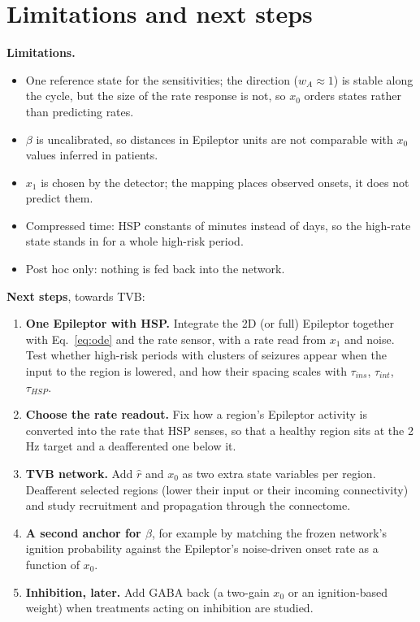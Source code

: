 \documentclass[11pt]{article}
\begin{document}
\section{Limitations and next steps}
\textbf{Limitations.}
\begin{itemize}
\item One reference state for the sensitivities; the direction ($w_A\approx1$) is stable along the cycle, but the size of
the rate response is not, so $x_0$ orders states rather than predicting rates.
\item $\beta$ is uncalibrated, so distances in Epileptor units are not comparable with $x_0$ values inferred in patients.
\item $x_1$ is chosen by the detector; the mapping places observed onsets, it does not predict them.
\item Compressed time: HSP constants of minutes instead of days, so the high-rate state stands in for a whole high-risk
period.
\item Post hoc only: nothing is fed back into the network.
\end{itemize}

\textbf{Next steps}, towards TVB:
\begin{enumerate}
\item \textbf{One Epileptor with HSP.} Integrate the 2D (or full) Epileptor together with Eq.~\eqref{eq:ode} and the rate
sensor, with a rate read from $x_1$ and noise. Test whether high-risk periods with clusters of seizures appear when the
input to the region is lowered, and how their spacing scales with $\tau_{ins}$, $\tau_{int}$, $\tau_{HSP}$.
\item \textbf{Choose the rate readout.} Fix how a region's Epileptor activity is converted into the rate that HSP senses,
so that a healthy region sits at the 2\,Hz target and a deafferented one below it.
\item \textbf{TVB network.} Add $\hat r$ and $x_0$ as two extra state variables per region. Deafferent selected regions
(lower their input or their incoming connectivity) and study recruitment and propagation through the connectome.
\item \textbf{A second anchor for $\beta$}, for example by matching the frozen network's ignition probability against the
Epileptor's noise-driven onset rate as a function of $x_0$.
\item \textbf{Inhibition, later.} Add GABA back (a two-gain $x_0$ or an ignition-based weight) when treatments acting on
inhibition are studied.
\end{enumerate}
\end{document}

